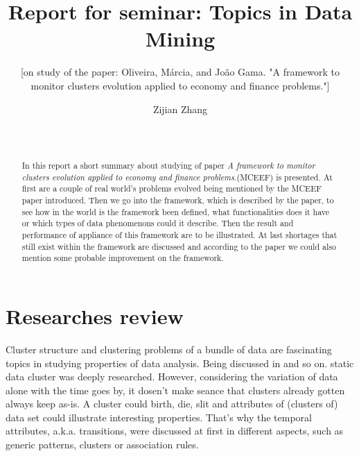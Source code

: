 \documentclass{sig-alternate}
\begin{document}

\title{Report for seminar: Topics in Data Mining}
\subtitle{[on study of the paper: Oliveira, Márcia, and João Gama. "A framework to monitor clusters evolution applied to economy and finance problems."]
}
\author{
\alignauthor Zijian Zhang\\
        \\
        \\
}

\maketitle
\begin{abstract}
In this report a short summary about studying of paper \emph{A framework to monitor clusters evolution applied to economy and finance problems.}(MCEEF) is presented. At first are a couple of real world's problems evolved being mentioned by the MCEEF paper introduced. Then we go into the framework, which is described by the paper, to see how in the world is the framework been defined, what functionalities does it have or which types of data phenomenons could it describe. Then the result and performance of appliance of this framework are to be illustrated. At last shortages that still exist within the framework are discussed and according to the paper we could also mention some probable improvement on the framework.
\end{abstract}

\section{Researches review}
Cluster structure and clustering problems of a bundle of data are fascinating topics in studying properties of data analysis. Being discussed in \cite{JAIN:Clustering} and so on. static data cluster was deeply researched. However, considering the variation of data alone with the time goes by, it dosen't make seance that clusters already gotten always keep as-is. A cluster could birth, die, slit and attributes of (clusters of) data set could illustrate interesting properties. That's why the temporal attributes, a.k.a. transitions, were discussed at first in different aspects, such as generic patterns\cite{GANTI:datachar}\cite{BARTOLINI:panda}\cite{CHAWATHE:changedetection}, clusters\cite{SPILIOPOULOU:transition}\cite{FALKOWSKI:socialnet}\cite{YANG:spatiotemporal} or association rules\cite{BARON:monitorminingresults}\cite{BARON:webusagepattern}.
\end{document}
